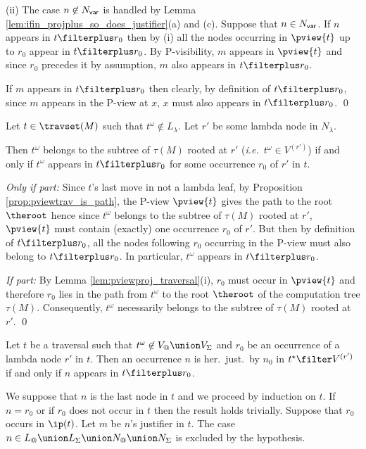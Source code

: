 (ii) The case $n\not\in  N_{\sf var}$ is handled by Lemma
\ref{lem:ifin_projplus_so_does_justifier}(a) and (c). Suppose that
$n\in  N_{\sf var}$. If $n$ appears in $t\filterplus r_0$ then by
(i) all the nodes occurring in $\pview{t}$ up to $r_0$ appear in
$t\filterplus r_0$. By P-visibility, $m$ appears in $\pview{t}$ and
since $r_0$ precedes it by assumption, $m$ also appears in
$t\filterplus r_0$.

If $m$ appears in $t\filterplus r_0$ then clearly, by definition of
$t\filterplus r_0$, since $m$ appears in the P-view at $x$, $x$ must
also appears in $t\filterplus r_0$. \qed


\begin{lemma}
\label{lem:insubterm_equ_inprojplus}
   Let $t \in \travset(M)$ such that $t^\omega \not\in L_\lambda$. Let $r'$ be some lambda node in $N_\lambda$.

   Then $t^\omega$ belongs to the subtree of $\tau(M)$ rooted at $r'$ ({\it i.e.}\ $t^\omega \in V^{(r')}$) if and only if
   $t^\omega$ appears in $t\filterplus r_0$ for some occurrence $r_0$ of $r'$ in $t$.
\end{lemma}

\proof
\emph{Only if part:} Since $t$'s last move in not a lambda leaf, by
Proposition \ref{prop:pviewtrav_is_path}, the P-view $\pview{t}$
gives the path to the root $\theroot$ hence since $t^\omega$ belongs
to the subtree of $\tau(M)$ rooted at $r'$, $\pview{t}$ must contain
(exactly) one occurrence $r_0$ of $r'$. But then by definition of $t\filterplus r_0$, all the nodes following $r_0$
occurring in the P-view must also belong to $t\filterplus r_0$. In particular, $t^\omega$ appears in $t\filterplus r_0$.

\emph{If part:} By Lemma \ref{lem:pviewproj_traversal}(i), $r_0$ must occur in $\pview{t}$
and therefore $r_0$ lies in the path from $t^\omega$ to the root $\theroot$ of the computation
tree $\tau(M)$. Consequently, $t^\omega$ necessarily belongs to the subtree of $\tau(M)$ rooted at $r'$.
\qed
\smallskip

\begin{lemma}
\label{lem:intfilterstar_iff_hjintstarfiltersubtree}
 Let $t$ be a traversal such that $t^\omega \not\in V_@ \union V_\Sigma$
and $r_0$ be an occurrence of a lambda node $r'$ in $t$. Then an
occurrence $n$ is her.\ just.\ by $n_0$ in $t^\star\filter V^{(r')}$
if and only if $n$ appears in $t\filterplus r_0$.
\end{lemma}
\proof We suppose that $n$ is the last node in $t$ and we proceed by
induction on $t$. If $n=r_0$ or if $r_0$ does not occur in $t$ then
the result holds trivially. Suppose that $r_0$ occurs in $\ip(t)$.
Let $m$ be $n$'s justifier in $t$. The case $n\in L_@ \union
L_\Sigma \union N_@ \union N_\Sigma$ is excluded by the hypothesis.

